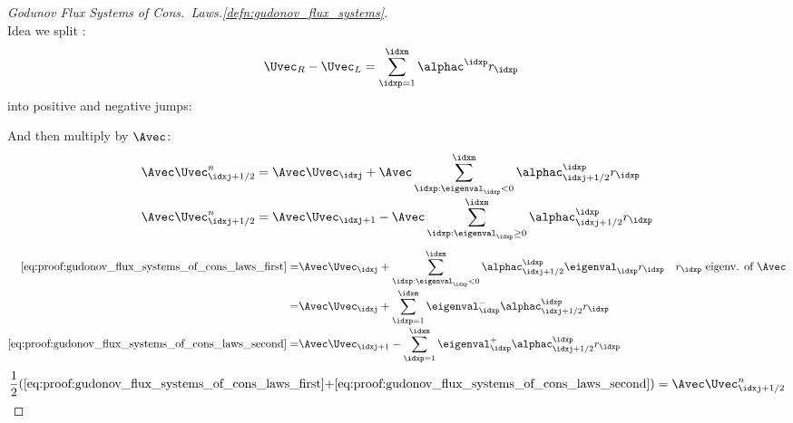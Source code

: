 \begin{proofbox}\nospacing
    \begin{proof}[Godunov Flux Systems of Cons.\ Laws.\cref{defn:gudonov_flux_systems}]\label{proof:gudonov_flux_systems_of_cons_laws}\leavevmode\\
        Idea we split :
        \begin{align*}
            \Uvec_{R}-\Uvec_{L}&=\sum_{\idxp=1}^{\idxm}\alphac^{\idxp}r_{\idxp}
        \end{align*}
        into positive and negative jumps:
        \begin{figure}[H]
            \centering{
              \def\svgwidth{130pt}
              \resizebox{0.6\linewidth}{!}{
                }
            }
        \end{figure}
        And then multiply by $\Avec$:
        \begin{align}
              &\Avec\Uvec_{\idxj+1/2}^{n}=\Avec\Uvec_{\idxj}+\Avec\sum_{\idxp:\eigenval_{\idxp}<0}^{\idxm}\alphac_{\idxj+1/2}^{\idxp}r_{\idxp}\label{eq:proof:gudonov_flux_systems_of_cons_laws_first}\\[-1\jot]
              &\Avec\Uvec_{\idxj+1/2}^{n}=\Avec\Uvec_{\idxj+1}-\Avec\sum_{\idxp:\eigenval_{\idxp}\geq0}^{\idxm}\alphac_{\idxj+1/2}^{\idxp}r_{\idxp}\label{eq:proof:gudonov_flux_systems_of_cons_laws_second}
        \end{align}
        \begin{align*}
          \ref{eq:proof:gudonov_flux_systems_of_cons_laws_first}
            =&\Avec\Uvec_{\idxj}+\sum_{\idxp:\eigenval_{\idxp}<0}^{\idxm}\alphac_{\idxj+1/2}^{\idxp}\eigenval_{\idxp}r_{\idxp}&&\text{$r_{\idxp}$ eigenv. of $\Avec$}\\[-1\jot]
            =&\Avec\Uvec_{\idxj}+\sum_{\idxp=1}^{\idxm}\eigenval_{\idxp}^{-}\alphac_{\idxj+1/2}^{\idxp}r_{\idxp}&&\\[-1\jot]
          \ref{eq:proof:gudonov_flux_systems_of_cons_laws_second}
            =&\Avec\Uvec_{\idxj+1}-\sum_{\idxp=1}^{\idxm}\eigenval_{\idxp}^{+}\alphac_{\idxj+1/2}^{\idxp}r_{\idxp}
        \end{align*}
        \begin{align*}
          \frac{1}{2}(\ref{eq:proof:gudonov_flux_systems_of_cons_laws_first}+&\ref{eq:proof:gudonov_flux_systems_of_cons_laws_second})
          =\Avec\Uvec_{\idxj+1/2}^{n}\\[-1\jot]

\end{align*}
\end{proof}
\end{proofbox}

